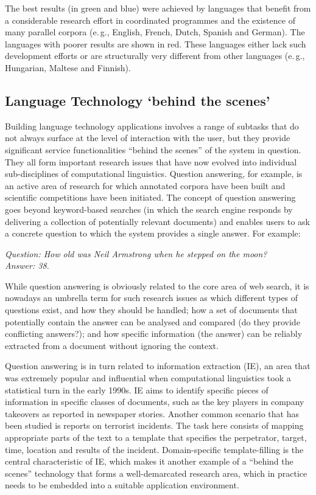 \documentclass[]{../../metanetpaper}
\begin{document}
\begin{multicols}{2}
The best results (in green and blue) were achieved by languages that benefit from a considerable research effort in coordinated programmes and the existence of many parallel corpora (e.\,g., English, French, Dutch, Spanish and German). The languages with poorer results are shown in red. These languages either lack such development efforts or are structurally very different from other languages (e.\,g., Hungarian, Maltese and Finnish).

\subsection{Language Technology `behind the scenes'}

Building language technology applications involves a range of subtasks that do not always surface at the level of interaction with the user, but they provide significant service functionalities “behind the scenes” of the system in question. They all form important research issues that have now evolved into individual sub-disciplines of computational linguistics.  Question answering, for example, is an active area of research for which annotated corpora have been built and scientific competitions have been initiated. The concept of question answering goes beyond keyword-based searches (in which the search engine responds by delivering a collection of potentially relevant documents) and enables users to ask a concrete question to which the system provides a single answer. For example:

\textit{Question: How old was Neil Armstrong when he stepped on the moon?}\\
\textit{Answer: 38.}

While question answering is obviously related to the core area of web search, it is nowadays an umbrella term for such research issues as which different types of questions exist, and how they should be handled; how a set of documents that potentially contain the answer can be analysed and compared (do they provide conflicting answers?); and how specific information (the answer) can be reliably extracted from a document without ignoring the context.


Question answering is in turn related to information extraction (IE), an area that was extremely popular and influential when computational linguistics took a statistical turn in the early 1990s. IE aims to identify specific pieces of information in specific classes of documents, such as the key players in company takeovers as reported in newspaper stories. Another common scenario that has been studied is reports on terrorist incidents. The task here consists of mapping appropriate parts of the text to a template that specifies the perpetrator, target, time, location and results of the incident. Domain-specific template-filling is the central characteristic of IE, which makes it another example of a “behind the scenes” technology that forms a well-demarcated research area, which in practice needs to be embedded into a suitable application environment.


\end{multicols}
\end{document}
